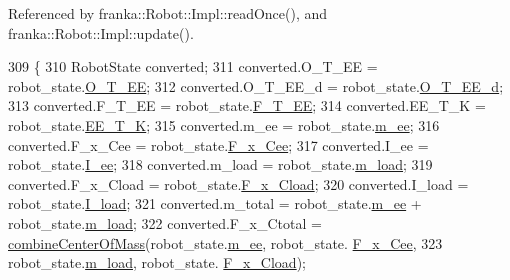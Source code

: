 Referenced by franka\+::\+Robot\+::\+Impl\+::read\+Once(), and franka\+::\+Robot\+::\+Impl\+::update().


\begin{DoxyCode}
309                                                                                             \{
310   RobotState converted;
311   converted.O\_T\_EE = robot\_state.\hyperlink{structresearch__interface_1_1robot_1_1RobotState_ae08012fa47c14854e7df2e23e06f9cc8}{O\_T\_EE};
312   converted.O\_T\_EE\_d = robot\_state.\hyperlink{structresearch__interface_1_1robot_1_1RobotState_adc9d94f4d9d01026a45f496851578549}{O\_T\_EE\_d};
313   converted.F\_T\_EE = robot\_state.\hyperlink{structresearch__interface_1_1robot_1_1RobotState_a8b2bfb818136741f4430b7bf24c6371d}{F\_T\_EE};
314   converted.EE\_T\_K = robot\_state.\hyperlink{structresearch__interface_1_1robot_1_1RobotState_ab3ae394f44f83d8b662116fe2646f878}{EE\_T\_K};
315   converted.m\_ee = robot\_state.\hyperlink{structresearch__interface_1_1robot_1_1RobotState_ad2a90c42e0bfe6afd63c9c6cb9ffe296}{m\_ee};
316   converted.F\_x\_Cee = robot\_state.\hyperlink{structresearch__interface_1_1robot_1_1RobotState_a3a90284a35ace0f9195d908bd1be9bff}{F\_x\_Cee};
317   converted.I\_ee = robot\_state.\hyperlink{structresearch__interface_1_1robot_1_1RobotState_a0084f1511609a0e1fb8129322fbc3615}{I\_ee};
318   converted.m\_load = robot\_state.\hyperlink{structresearch__interface_1_1robot_1_1RobotState_a8c9a58bb09391b1fd11a1b016540b46c}{m\_load};
319   converted.F\_x\_Cload = robot\_state.\hyperlink{structresearch__interface_1_1robot_1_1RobotState_a25b4761b1d35bb62d1bb216a6645dc3b}{F\_x\_Cload};
320   converted.I\_load = robot\_state.\hyperlink{structresearch__interface_1_1robot_1_1RobotState_a3659f248d980cc8e41a47ccb925a990b}{I\_load};
321   converted.m\_total = robot\_state.\hyperlink{structresearch__interface_1_1robot_1_1RobotState_ad2a90c42e0bfe6afd63c9c6cb9ffe296}{m\_ee} + robot\_state.\hyperlink{structresearch__interface_1_1robot_1_1RobotState_a8c9a58bb09391b1fd11a1b016540b46c}{m\_load};
322   converted.F\_x\_Ctotal = \hyperlink{namespacefranka_a92a802942d91aff279534b952468dc51}{combineCenterOfMass}(robot\_state.\hyperlink{structresearch__interface_1_1robot_1_1RobotState_ad2a90c42e0bfe6afd63c9c6cb9ffe296}{m\_ee}, robot\_state.
      \hyperlink{structresearch__interface_1_1robot_1_1RobotState_a3a90284a35ace0f9195d908bd1be9bff}{F\_x\_Cee},
323                                              robot\_state.\hyperlink{structresearch__interface_1_1robot_1_1RobotState_a8c9a58bb09391b1fd11a1b016540b46c}{m\_load}, robot\_state.
      \hyperlink{structresearch__interface_1_1robot_1_1RobotState_a25b4761b1d35bb62d1bb216a6645dc3b}{F\_x\_Cload});

\end{DoxyCode}
